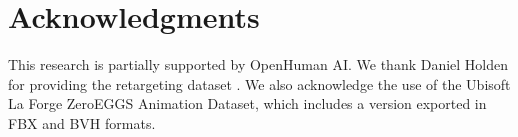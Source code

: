 %


\section*{Acknowledgments}

This research is partially supported by OpenHuman AI. We thank Daniel Holden for providing the retargeting dataset \cite{ghorbani2022zeroeggs}. We also acknowledge the use of the Ubisoft La Forge ZeroEGGS Animation Dataset, which includes a version exported in FBX and BVH formats.
